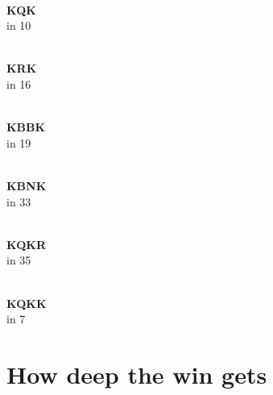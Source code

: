 \documentclass[11pt]{article}
\begin{document}
\begin{center}
\begin{minipage}{0.155\textwidth}\centering
  \\[1.2mm]
  {\small\color{kqk}\textbf{KQK}\\in 10}
\end{minipage}\hfill
\begin{minipage}{0.155\textwidth}\centering
  \\[1.2mm]
  {\small\color{krk}\textbf{KRK}\\in 16}
\end{minipage}\hfill
\begin{minipage}{0.155\textwidth}\centering
  \\[1.2mm]
  {\small\color{kbbk}\textbf{KBBK}\\in 19}
\end{minipage}\hfill
\begin{minipage}{0.155\textwidth}\centering
  \\[1.2mm]
  {\small\color{kbnk}\textbf{KBNK}\\in 33}
\end{minipage}\hfill
\begin{minipage}{0.155\textwidth}\centering
  \\[1.2mm]
  {\small\color{kqkr}\textbf{KQKR}\\in 35}
\end{minipage}\hfill
\begin{minipage}{0.155\textwidth}\centering
  \\[1.2mm]
  {\small\color{kqkk}\textbf{KQKK}\\in 7}
\end{minipage}
\end{center}

\vspace{6mm}
\section{How deep the win gets}\label{sec:depth}
\end{document}
